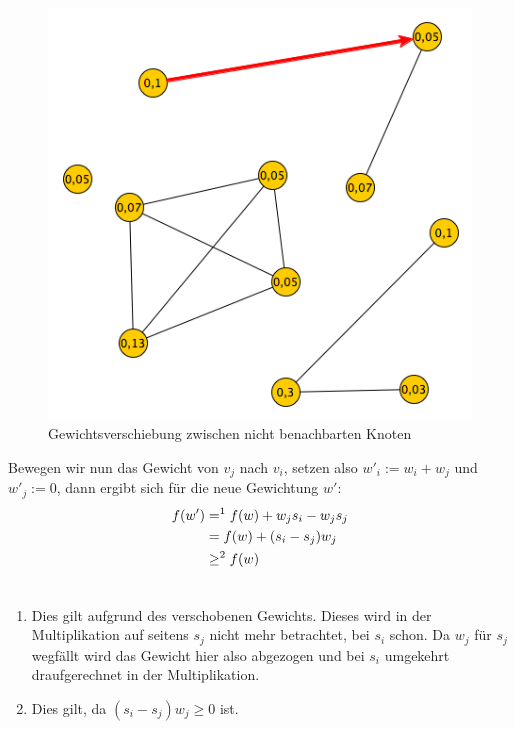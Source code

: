 \documentclass[12pt, a4paper]{article}
\begin{document}
\begin{figure}[H] 
		\centering
		\includegraphics[page=1, width=\textwidth]{assets/proof3_first_move}
		\caption{Gewichtsverschiebung zwischen nicht benachbarten Knoten} 
\end{figure}

Bewegen wir nun das Gewicht von $v_j$ nach $v_i$, setzen also $w'_i := w_i + w_j$ und $w'_j := 0$, dann ergibt sich für die neue Gewichtung $w'$:
\begin{gather}
\begin{split}f(w') &=^1 f(w) + w_j s_i - w_j s_j \\
&= f(w) + (s_i - s_j) w_j \\
&\ge^2 f(w)\end{split}\notag\\\begin{split}\end{split}\notag
\end{gather}\begin{enumerate}
\item {}
Dies gilt aufgrund des verschobenen Gewichts. Dieses wird in der Multiplikation auf seitens $s_j$ nicht mehr betrachtet, bei $s_i$ schon. Da $w_j$ für $s_j$ wegfällt wird das Gewicht hier also abgezogen und bei $s_i$ umgekehrt draufgerechnet in der Multiplikation.

\item {}
Dies gilt, da $(s_i - s_j) w_j \ge 0$ ist.

\end{enumerate}
\end{document}
